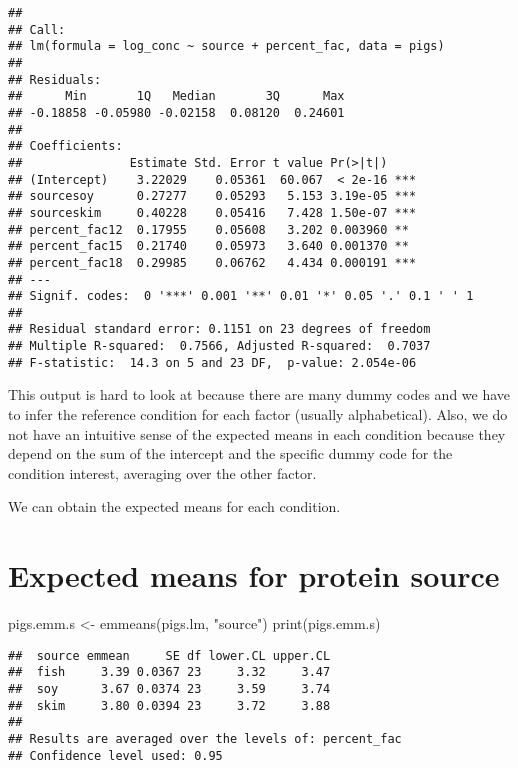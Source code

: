 \documentclass[
]{book}
\newenvironment{Shaded}{\begin{snugshade}}{\end{snugshade}}
\newcommand{\FunctionTok}[1]{\textcolor[rgb]{0.00,0.00,0.00}{#1}}
\newcommand{\NormalTok}[1]{#1}
\newcommand{\OtherTok}[1]{\textcolor[rgb]{0.56,0.35,0.01}{#1}}
\newcommand{\StringTok}[1]{\textcolor[rgb]{0.31,0.60,0.02}{#1}}
\begin{document}
\begin{verbatim}
## 
## Call:
## lm(formula = log_conc ~ source + percent_fac, data = pigs)
## 
## Residuals:
##      Min       1Q   Median       3Q      Max 
## -0.18858 -0.05980 -0.02158  0.08120  0.24601 
## 
## Coefficients:
##               Estimate Std. Error t value Pr(>|t|)    
## (Intercept)    3.22029    0.05361  60.067  < 2e-16 ***
## sourcesoy      0.27277    0.05293   5.153 3.19e-05 ***
## sourceskim     0.40228    0.05416   7.428 1.50e-07 ***
## percent_fac12  0.17955    0.05608   3.202 0.003960 ** 
## percent_fac15  0.21740    0.05973   3.640 0.001370 ** 
## percent_fac18  0.29985    0.06762   4.434 0.000191 ***
## ---
## Signif. codes:  0 '***' 0.001 '**' 0.01 '*' 0.05 '.' 0.1 ' ' 1
## 
## Residual standard error: 0.1151 on 23 degrees of freedom
## Multiple R-squared:  0.7566, Adjusted R-squared:  0.7037 
## F-statistic:  14.3 on 5 and 23 DF,  p-value: 2.054e-06
\end{verbatim}

This output is hard to look at because there are many dummy codes and we have to infer the reference condition for each factor (usually alphabetical). Also, we do not have an intuitive sense of the expected means in each condition because they depend on the sum of the intercept and the specific dummy code for the condition interest, averaging over the other factor.

We can obtain the expected means for each condition.

\hypertarget{expected-means-for-protein-source}{%
\section{Expected means for protein source}\label{expected-means-for-protein-source}}

\begin{Shaded}
\begin{Highlighting}[]
\NormalTok{pigs.emm.s }\OtherTok{\textless{}{-}} \FunctionTok{emmeans}\NormalTok{(pigs.lm, }\StringTok{"source"}\NormalTok{)}
\FunctionTok{print}\NormalTok{(pigs.emm.s)}
\end{Highlighting}
\end{Shaded}

\begin{verbatim}
##  source emmean     SE df lower.CL upper.CL
##  fish     3.39 0.0367 23     3.32     3.47
##  soy      3.67 0.0374 23     3.59     3.74
##  skim     3.80 0.0394 23     3.72     3.88
## 
## Results are averaged over the levels of: percent_fac 
## Confidence level used: 0.95
\end{verbatim}
\end{document}
